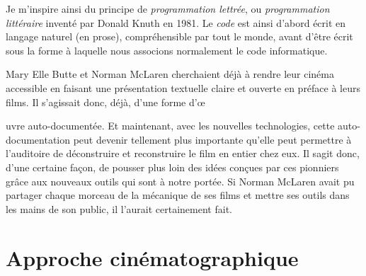 Je m'inspire ainsi du principe de \textit{programmation lettrée}, ou \textit{programmation littéraire} inventé par Donald Knuth en 1981. Le \textit{code} est ainsi d'abord écrit en langage naturel (en prose), compréhensible par tout le monde, avant d'être écrit sous la forme à laquelle nous associons normalement le code informatique.

Mary Elle Butte et Norman McLaren cherchaient déjà à rendre leur cinéma accessible en faisant une présentation textuelle claire et ouverte en préface à leurs films. Il s'agissait donc, déjà, d'une forme d'\oe{uvre auto-documentée. Et maintenant, avec les nouvelles technologies, cette auto-documentation peut devenir tellement plus importante qu'elle peut permettre à l'auditoire de déconstruire et reconstruire le film en entier chez eux. Il sagit donc, d'une certaine façon, de pousser plus loin des idées conçues par ces pionniers grâce aux nouveaux outils qui sont à notre portée. Si Norman McLaren avait pu partager chaque morceau de la mécanique de ses films et mettre ses outils dans les mains de son public, il l'aurait certainement fait.






\section{Approche cinématographique}


}
